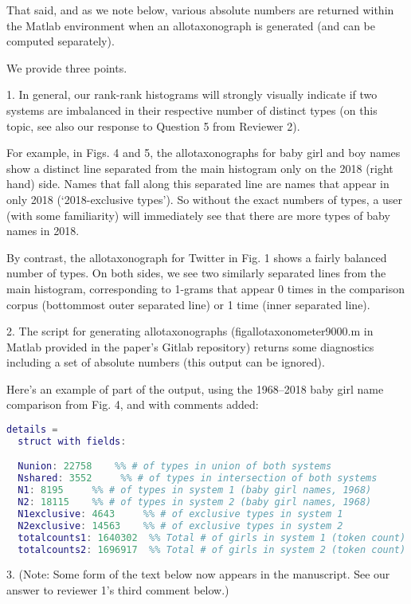 That said, and as we note below, various absolute numbers
are returned within the Matlab environment when an allotaxonograph
is generated (and can be computed separately).

We provide three points.

1.
In general, our rank-rank histograms will strongly visually indicate if two
systems are imbalanced in their respective number of distinct types
(on this topic, see also our response to Question 5 from Reviewer 2).

For example, in Figs. 4 and 5, the allotaxonographs for baby girl and boy names
show a distinct line separated from the main histogram only on the 2018 (right hand) side.
Names that fall along this separated line are names that
appear in only 2018 (`2018-exclusive types').
So without the exact numbers of types, a user (with some familiarity)
will immediately see that there are more types
of baby names in 2018.

By contrast, the allotaxonograph for Twitter in Fig. 1 shows a fairly balanced number of types.
On both sides, we see two similarly separated lines from the main histogram, corresponding to 1-grams
that appear 0 times in the comparison corpus
(bottommost outer separated line) or 1 time (inner separated line).

2.
The script for generating allotaxonographs (figallotaxonometer9000.m in Matlab provided in the paper's Gitlab repository)
returns some diagnostics
including a set of absolute numbers (this output can be ignored).

Here's an example of part of the output,
using the 1968--2018 baby girl name comparison from Fig. 4,
and with comments added:
\begin{lstlisting}[language=Matlab]
  details = 
  struct with fields:

  Nunion: 22758    %% # of types in union of both systems
  Nshared: 3552     %% # of types in intersection of both systems
  N1: 8195     %% # of types in system 1 (baby girl names, 1968)
  N2: 18115    %% # of types in system 2 (baby girl names, 1968)
  N1exclusive: 4643     %% # of exclusive types in system 1
  N2exclusive: 14563    %% # of exclusive types in system 2
  totalcounts1: 1640302  %% Total # of girls in system 1 (token count)
  totalcounts2: 1696917  %% Total # of girls in system 2 (token count)
\end{lstlisting}

3.
(Note: Some form of the text below now appears in the manuscript.
See our answer to reviewer 1's third comment below.)


